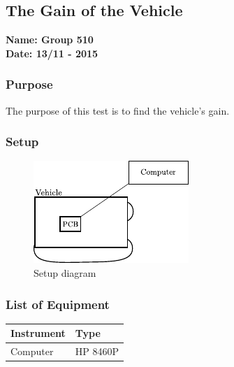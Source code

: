 \pagebreak
\subsection{The Gain of the Vehicle} %
\textbf{Name: Group 510}\\
\textbf{Date: 13/11 - 2015}

\subsubsection{Purpose}
The purpose of this test is to find the vehicle's gain.

\subsubsection{Setup}

\begin{figure}[H]
	\centering
	\includegraphics[scale=1.6]{figures/inertiaTestSetupDiagram2.pdf}
	\caption{Setup diagram}
	\label{GainAndTimeTestSetupDiagram}
\end{figure}

\subsubsection{List of Equipment}

\begin{table}[H]
\begin{tabular}{|p{10cm}|p{4cm}|}
\hline%
  \textbf{Instrument}                     &  \textbf{Type}       \\
\hline%
  Computer                                &  HP 8460P    \\
\hline %
\end{tabular}
\end{table}

